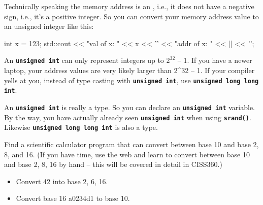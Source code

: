 Technically speaking the memory address is an , i.e., it does not have a negative sign, i.e., it's a positive integer. So you can convert your memory address value to an unsigned integer like this:

\begin{consolethree}[escapeinside=||]
int x = 123;
std::cout << "val of x: " << x
          << '\n' << "addr of x: "
          << ||
          << '\n';
\end{consolethree}
An \texttt{\textbf{unsigned int}} can only represent integers up to $2^{32}$ -- 1. If you have a newer laptop, your address values are very likely larger than 2\^{}32 -- 1. If your compiler yells at you, instead of type casting with \texttt{\textbf{unsigned int}}, use \texttt{\textbf{unsigned long long int}}.

An \texttt{\textbf{unsigned int}} is really a type. So you can declare an \texttt{\textbf{unsigned int}} variable. By the way, you have actually already seen \texttt{\textbf{unsigned int}} when using \texttt{\textbf{srand()}}. Likewise \texttt{\textbf{unsigned long long int}} is also a type.

\begin{ex} Find a scientific calculator program that can convert between base 10 and base 2, 8, and 16. (If you have time, use the web and learn to convert between base 10 and base 2, 8, 16 by hand -- this will be covered in detail in CISS360.)
\begin{itemize}
\item
  Convert 42 into base 2, 6, 16.
\item
  Convert base 16 a0234d1 to base 10.
\end{itemize}
\end{ex}

